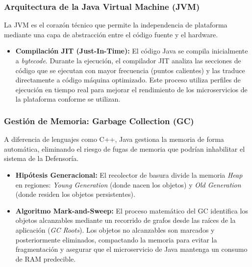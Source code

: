\subsubsection{Arquitectura de la Java Virtual Machine (JVM)}
La JVM es el corazón técnico que permite la independencia de plataforma mediante una capa de abstracción entre el código fuente y el hardware.
\begin{itemize}
    \item \textbf{Compilación JIT (Just-In-Time):} El código Java se compila inicialmente a \textit{bytecode}. Durante la ejecución, el compilador JIT analiza las secciones de código que se ejecutan con mayor frecuencia (puntos calientes) y las traduce directamente a código máquina optimizado. Este proceso utiliza perfiles de ejecución en tiempo real para mejorar el rendimiento de los microservicios de la plataforma conforme se utilizan.
\end{itemize}



\subsubsection{Gestión de Memoria: Garbage Collection (GC)}
A diferencia de lenguajes como C++, Java gestiona la memoria de forma automática, eliminando el riesgo de fugas de memoria que podrían inhabilitar el sistema de la Defensoría.
\begin{itemize}
    \item \textbf{Hipótesis Generacional:} El recolector de basura divide la memoria \textit{Heap} en regiones: \textit{Young Generation} (donde nacen los objetos) y \textit{Old Generation} (donde residen los objetos persistentes). 
    \item \textbf{Algoritmo Mark-and-Sweep:} El proceso matemático del GC identifica los objetos alcanzables mediante un recorrido de grafos desde las raíces de la aplicación (\textit{GC Roots}). Los objetos no alcanzables son marcados y posteriormente eliminados, compactando la memoria para evitar la fragmentación y asegurar que el microservicio de Java mantenga un consumo de RAM predecible.
\end{itemize}

